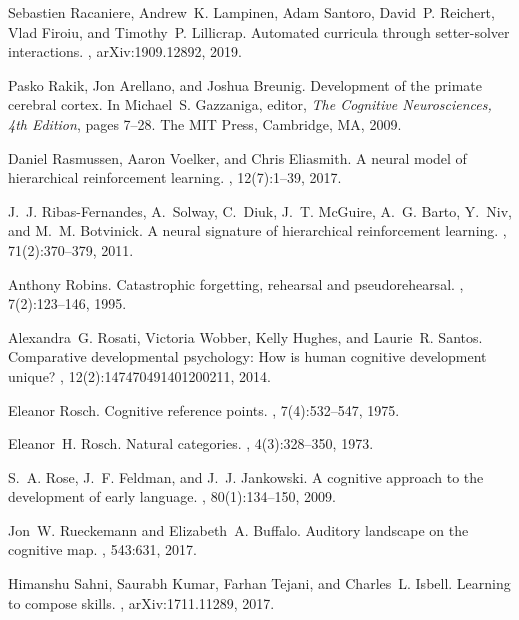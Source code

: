 \documentclass[letterpaper,11pt]{article}
\begin{document}
\begin{thebibliography}{100}
Sebastien Racaniere, Andrew~K. Lampinen, Adam Santoro, David~P. Reichert, Vlad
  Firoiu, and Timothy~P. Lillicrap.
\newblock Automated curricula through setter-solver interactions.
, arXiv:1909.12892, 2019.

Pasko Rakik, Jon Arellano, and Joshua Breunig.
\newblock Development of the primate cerebral cortex.
\newblock In Michael~S. Gazzaniga, editor, {\em The Cognitive Neurosciences,
  4th Edition}, pages 7--28. The MIT Press, Cambridge, MA, 2009.

Daniel Rasmussen, Aaron Voelker, and Chris Eliasmith.
\newblock A neural model of hierarchical reinforcement learning.
, 12(7):1--39, 2017.

J.~J. Ribas-Fernandes, A.~Solway, C.~Diuk, J.~T. McGuire, A.~G. Barto, Y.~Niv,
  and M.~M. Botvinick.
\newblock A neural signature of hierarchical reinforcement learning.
, 71(2):370--379, 2011.

Anthony Robins.
\newblock Catastrophic forgetting, rehearsal and pseudorehearsal.
, 7(2):123--146, 1995.

Alexandra~G. Rosati, Victoria Wobber, Kelly Hughes, and Laurie~R. Santos.
\newblock Comparative developmental psychology: How is human cognitive
  development unique?
, 12(2):147470491401200211, 2014.

Eleanor Rosch.
\newblock Cognitive reference points.
, 7(4):532--547, 1975.

Eleanor~H. Rosch.
\newblock Natural categories.
, 4(3):328--350, 1973.

S.~A. Rose, J.~F. Feldman, and J.~J. Jankowski.
\newblock A cognitive approach to the development of early language.
, 80(1):134--150, 2009.

Jon~W. Rueckemann and Elizabeth~A. Buffalo.
\newblock Auditory landscape on the cognitive map.
, 543:631, 2017.

Himanshu Sahni, Saurabh Kumar, Farhan Tejani, and Charles~L. Isbell.
\newblock Learning to compose skills.
, arXiv:1711.11289, 2017.


\end{thebibliography}
\end{document}
